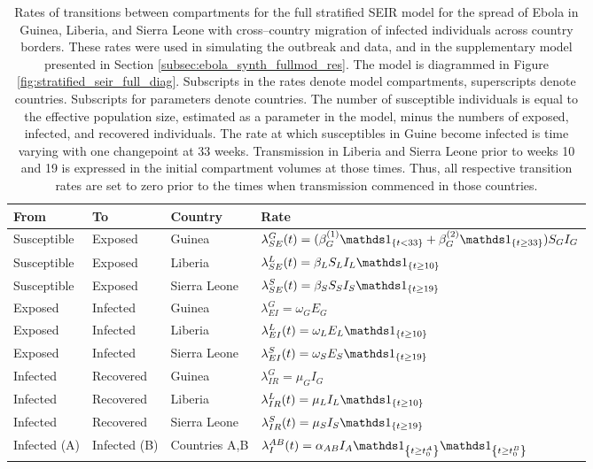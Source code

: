 \begin{table}[htbp]
	\caption[Transmission rates for the stratified SEIR model with migration of infecteds for Ebola in West Africa.]{Rates of transitions between compartments for the full stratified SEIR model for the spread of Ebola in Guinea, Liberia, and Sierra Leone with cross--country migration of infected individuals across country borders. These rates were used in simulating the outbreak and data, and in the supplementary model presented in Section \ref{subsec:ebola_synth_fullmod_res}. The model is diagrammed in Figure \ref{fig:stratified_seir_full_diag}. Subscripts in the rates denote model compartments, superscripts denote countries. Subscripts for parameters denote countries. The number of susceptible individuals is equal to the effective population size, estimated as a parameter in the model, minus the numbers of exposed, infected, and recovered individuals. The rate at which susceptibles in Guine become infected is time varying with one changepoint at 33 weeks. Transmission in Liberia and Sierra Leone prior to weeks 10 and 19 is expressed in the initial compartment volumes at those times. Thus, all respective transition rates are set to zero prior to the times when transmission commenced in those countries.}
	\label{tab:ebola_synth_rates_full}
	\centering\footnotesize
	\begin{tabular}{llll}
		\hline
		\textbf{From} & \textbf{To} & \textbf{Country} & \textbf{Rate} \\
		\hline
		Susceptible & Exposed & Guinea & $ \lambda_{SE}^G(t) = (\beta_G^{(1)} \ind{t<33} + \beta_G^{(2)}\ind{t\geq33})S_GI_G $ \\
		Susceptible & Exposed & Liberia & $ \lambda_{SE}^L(t) = \beta_LS_LI_L\ind{t\geq10} $\\
		Susceptible & Exposed & Sierra Leone & $ \lambda_{SE}^S(t) = \beta_SS_SI_S\ind{t\geq19} $ \\
		Exposed & Infected & Guinea & $ \lambda_{EI}^G = \omega_GE_G $\\
		Exposed & Infected & Liberia & $ \lambda_{EI}^L(t) = \omega_LE_L\ind{t\geq10} $ \\
		Exposed & Infected & Sierra Leone & $\lambda_{EI}^S(t) = \omega_SE_S\ind{t\geq19}$ \\
		Infected & Recovered & Guinea & $ \lambda_{IR}^G = \mu_GI_G $ \\
		Infected & Recovered & Liberia & $ \lambda_{IR}^L(t) = \mu_LI_L\ind{t\geq10} $ \\	
		Infected & Recovered & Sierra Leone & $ \lambda_{IR}^S(t) = \mu_SI_S\ind{t\geq19} $ \\
		Infected (A) & Infected (B) & Countries A,B & $ \lambda_I ^{AB}(t) = \alpha_{AB}I_A\ind{t\geq{t_{0}^A}}\ind{t\geq t_{0}^B}$\\
		\hline
	\end{tabular}
\end{table}

